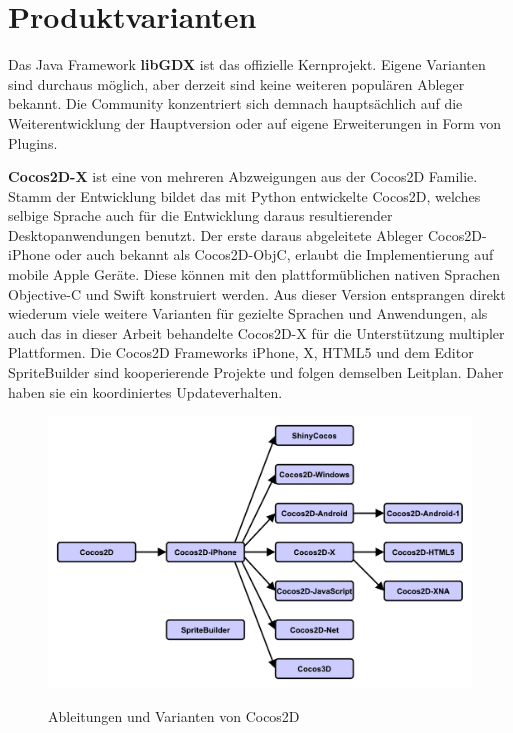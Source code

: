 \section{Produktvarianten}
Das Java Framework \textbf{libGDX} ist das offizielle Kernprojekt. Eigene Varianten sind durchaus möglich, aber derzeit sind keine weiteren populären Ableger bekannt. Die Community konzentriert sich demnach hauptsächlich auf die Weiterentwicklung der Hauptversion oder auf eigene Erweiterungen in Form von Plugins.
\medskip

\textbf{Cocos2D-X} ist eine von mehreren Abzweigungen aus der Cocos2D Familie. Stamm der Entwicklung bildet das mit Python entwickelte Cocos2D, welches selbige Sprache auch für die Entwicklung daraus resultierender Desktopanwendungen benutzt. Der erste daraus abgeleitete Ableger Cocos2D-iPhone oder auch bekannt als Cocos2D-ObjC, erlaubt die Implementierung auf mobile Apple Geräte. Diese können mit den plattformüblichen nativen Sprachen Objective-C und Swift konstruiert werden. Aus dieser Version entsprangen direkt wiederum viele weitere Varianten für gezielte Sprachen und Anwendungen, als auch das in dieser Arbeit behandelte Cocos2D-X für die Unterstützung multipler Plattformen. Die Cocos2D Frameworks iPhone, X, HTML5 und dem Editor SpriteBuilder sind kooperierende Projekte und folgen demselben Leitplan. Daher haben sie ein koordiniertes Updateverhalten. \citep{cocos2d_relationships}

\begin{figure}[htbp]
	\centering
	\includegraphics[width=1\textwidth]{Bilder/Cocos2d_Relationships}
	\caption{Ableitungen und Varianten von Cocos2D}\label{graph_Cocos2d_Relationships}\citep{cocos2d_relationships}
\end{figure}


